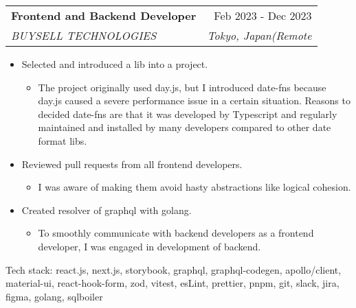 \documentclass[letterpaper,11pt]{article}
\makeatletter
\newcommand{\resumeItem}[1]{
  \item\large{
    {#1 \vspace{0pt}}
  }
}
\newcommand{\resumeSubheading}[4]{
  \vspace{-2pt}\item
    \begin{tabular*}{0.97\textwidth}[t]{l@{\extracolsep{\fill}}r}
      \textbf{#1} & #2 \\
      \textit{\small#3} & \textit{\small #4} \\
    \end{tabular*}\vspace{-7pt}
}
\makeatother
\begin{document}
  \resumeSubheading
      {Frontend and Backend Developer}{Feb 2023 - Dec 2023}
      {BUYSELL TECHNOLOGIES}{Tokyo, Japan(Remote}
      \begin{itemize}
        \resumeItem{Selected and introduced a lib into a project.}
        \begin{itemize}
          \item {The project originally used day.js, but I introduced date-fns because day.js caused a severe performance issue in a certain situation. Reasons to decided date-fns are that it was developed by Typescript and regularly maintained and installed by many developers compared to other date format libs.}
        \end{itemize}
        \resumeItem{Reviewed pull requests from all frontend developers.}
        \begin{itemize}
          \item {I was aware of making them avoid hasty abstractions like logical cohesion.}
        \end{itemize}
        \resumeItem{Created resolver of graphql with golang.}
        \begin{itemize}
          \item {To smoothly communicate with backend developers as a frontend developer, I was engaged in development of backend.}
        \end{itemize}
      \end{itemize}
      {Tech stack: react.js, next.js, storybook, graphql, graphql-codegen, apollo/client, material-ui, react-hook-form, zod, vitest, esLint, prettier, pnpm, git, slack, jira, figma, golang, sqlboiler}
\end{document}
